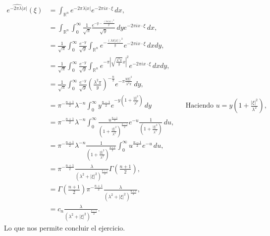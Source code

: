 \begin{homeworkProblem}
\begin{solution}
    \begin{align*}
      \hat{e^{-2\pi\lambda|x|}}(\xi)&=\int_{\mathbb{R}^{n}}e^{-2\pi\lambda|x|}e^{-2\pi ix\cdot\xi}\, dx,\\
      &=\int_{\mathbb{R}^{n}}\int_{0}^{\infty}\frac{1}{\sqrt{\pi}}\frac{e^{-y-\frac{(\lambda\pi|x|)^2}{y}}}{\sqrt{y}}\, dy e^{-2\pi ix\cdot\xi}\, dx,\\
      &=\frac{1}{\sqrt{\pi}}\int_{0}^{\infty}\frac{e^{-y}}{\sqrt{y}}\int_{\mathbb{R}^{n}}e^{-\frac{(\lambda\pi|x|)^2}{y}}e^{-2\pi ix\cdot\xi}\, dxdy,\\
      &=\frac{1}{\sqrt{\pi}}\int_{0}^{\infty}\frac{e^{-y}}{\sqrt{y}}\int_{\mathbb{R}^{n}}e^{-\pi\left|\sqrt{\frac{\lambda^2\pi}{y}}x\right|^2}e^{-2\pi ix\cdot\xi}\, dxdy,\\
      &=\frac{1}{\sqrt{\pi}}\int_{0}^{\infty}\frac{e^{-y}}{\sqrt{y}}\left( \frac{\lambda^2\pi}{y} \right)^{-\frac{n}{2}}e^{-\pi\frac{y|\xi|^2}{\lambda^2\pi}}\, dy,\\
      &=\pi^{-\frac{n+1}{2}}\lambda^{-n}\int_{0}^{\infty}y^{\frac{n-1}{2}}e^{-y\left( 1+\frac{|\xi|^2}{\lambda^2} \right)}\, dy &&\text{Haciendo $u=y\left( 1+\frac{|\xi|^2}{\lambda^2} \right)$,}\\
      &=\pi^{-\frac{n+1}{2}}\lambda^{-n}\int_{0}^{\infty}\frac{u^{\frac{n-1}{2}}}{\left( 1+\frac{|\xi|^2}{\lambda^2} \right)^{\frac{n-1}{2}}}e^{-u}\frac{1}{\left(1+\frac{|\xi|^2}{\lambda^2}\right)}\, du,\\
      &=\pi^{-\frac{n+1}{2}}\lambda^{-n}\frac{1}{\left( 1+ \frac{|\xi|^2}{\lambda^2}\right)^{\frac{n+1}{2}}}\int_{0}^{\infty}u^{\frac{n-1}{2}}e^{-u}\, du,\\
      &=\pi^{-\frac{n+1}{2}}\frac{\lambda}{\left( \lambda^2+|\xi|^2 \right)^{\frac{n+1}{2}}}\Gamma\left( \frac{n+1}{2} \right),\\
      &=\Gamma\left( \frac{n+1}{2} \right)\pi^{-\frac{n+1}{2}}\frac{\lambda}{\left( \lambda^2+|\xi|^2 \right)^{\frac{n+1}{2}}},\\
      &=c_n\frac{\lambda}{\left( \lambda^2+|\xi|^{2} \right)^{\frac{n+1}{2}}}.
    \end{align*}
    Lo que nos permite concluir el ejercicio.
  \end{solution}
\end{homeworkProblem}
